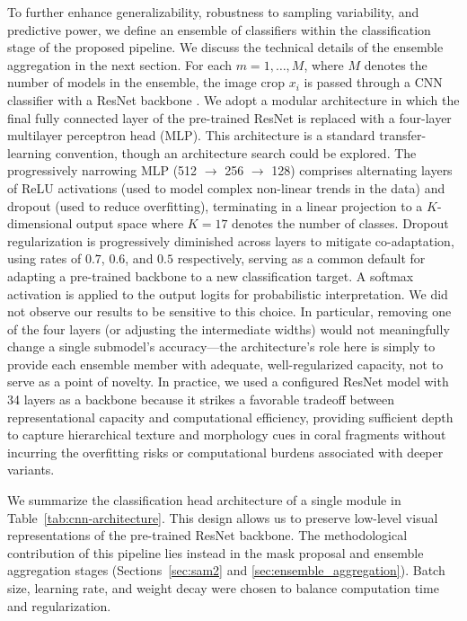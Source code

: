 \documentclass[11pt]{elsarticle}
\begin{document}
To further enhance generalizability, robustness to sampling variability, and predictive power, we define an ensemble of classifiers within the classification stage of the proposed pipeline. We discuss the technical details of the ensemble aggregation in the next section. For each $m = 1, \ldots, M$, where $M$ denotes the number of models in the ensemble, the image crop $x_i$ is passed through a CNN classifier with a ResNet backbone \citep{he2016deep}. We adopt a modular architecture in which the final fully connected layer of the pre-trained ResNet is replaced with a four-layer multilayer perceptron head (MLP). This architecture is a standard transfer-learning convention, though an architecture search could be explored. The progressively narrowing MLP (512 $\to$ 256 $\to$ 128) comprises alternating layers of ReLU activations (used to model complex non-linear trends in the data) and dropout (used to reduce overfitting), terminating in a linear projection to a $K$-dimensional output space where $K = 17$ denotes the number of classes. Dropout regularization is progressively diminished across layers to mitigate co-adaptation, using rates of $0.7$, $0.6$, and $0.5$ respectively, serving as a common default for adapting a pre-trained backbone to a new classification target. A softmax activation is applied to the output logits for probabilistic interpretation. We did not observe our results to be sensitive to this choice. In particular, removing one of the four layers (or adjusting the intermediate widths) would not meaningfully change a single submodel's accuracy---the architecture's role here is simply to provide each ensemble member with adequate, well-regularized capacity, not to serve as a point of novelty. In practice, we used a configured ResNet model with 34 layers as a backbone because it strikes a favorable tradeoff between representational capacity and computational efficiency, providing sufficient depth to capture hierarchical texture and morphology cues in coral fragments without incurring the overfitting risks or computational burdens associated with deeper variants.

We summarize the classification head architecture of a single module in Table~\ref{tab:cnn-architecture}. This design allows us to preserve low-level visual representations of the pre-trained ResNet backbone. The methodological contribution of this pipeline lies instead in the mask proposal and ensemble aggregation stages (Sections~\ref{sec:sam2} and \ref{sec:ensemble_aggregation}). Batch size, learning rate, and weight decay were chosen to balance computation time and regularization.
\end{document}
